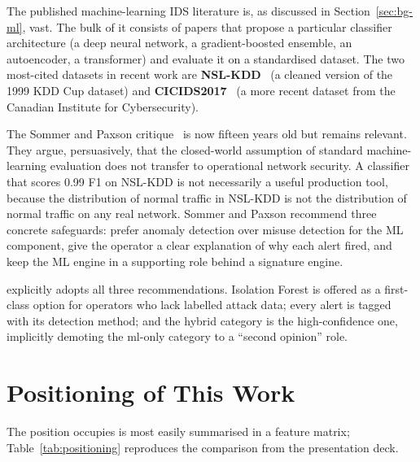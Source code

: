 The published machine-learning IDS literature is, as discussed in
Section~\ref{sec:bg-ml}, vast. The bulk of it consists of papers
that propose a particular classifier architecture (a deep neural
network, a gradient-boosted ensemble, an autoencoder, a transformer)
and evaluate it on a standardised dataset. The two most-cited
datasets in recent work are
\textbf{NSL-KDD}~\cite{tavallaee2009detailed} (a cleaned version of
the 1999 KDD Cup dataset) and
\textbf{CICIDS2017}~\cite{sharafaldin2018cicids} (a more recent
dataset from the Canadian Institute for Cybersecurity).

The Sommer and Paxson critique~\cite{sommer2010outside} is now
fifteen years old but remains relevant. They argue, persuasively,
that the closed-world assumption of standard machine-learning
evaluation does not transfer to operational network security. A
classifier that scores 0.99 F1 on NSL-KDD is not necessarily a
useful production tool, because the distribution of normal traffic
in NSL-KDD is not the distribution of normal traffic on any real
network. Sommer and Paxson recommend three concrete safeguards:
prefer anomaly detection over misuse detection for the ML
component, give the operator a clear explanation of why each alert
fired, and keep the ML engine in a supporting role behind a
signature engine.

\nidsname{} explicitly adopts all three recommendations. Isolation
Forest is offered as a first-class option for operators who lack
labelled attack data; every alert is tagged with its detection
method; and the hybrid category is the high-confidence one,
implicitly demoting the ml-only category to a ``second opinion''
role.

\section{Positioning of This Work}
\label{sec:rw-positioning}

The position \nidsname{} occupies is most easily summarised in a
feature matrix; Table~\ref{tab:positioning} reproduces the
comparison from the presentation deck.

